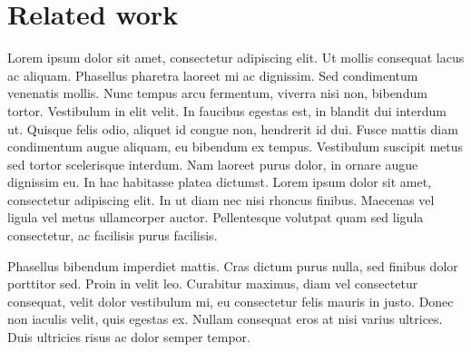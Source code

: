 \section{Related work}

Lorem ipsum dolor sit amet, consectetur adipiscing elit. Ut mollis consequat lacus ac aliquam. Phasellus pharetra laoreet mi ac dignissim. Sed condimentum venenatis mollis. Nunc tempus arcu fermentum, viverra nisi non, bibendum tortor. Vestibulum in elit velit. In faucibus egestas est, in blandit dui interdum ut. Quisque felis odio, aliquet id congue non, hendrerit id dui. Fusce mattis diam condimentum augue aliquam, eu bibendum ex tempus. Vestibulum suscipit metus sed tortor scelerisque interdum. Nam laoreet purus dolor, in ornare augue dignissim eu. In hac habitasse platea dictumst. Lorem ipsum dolor sit amet, consectetur adipiscing elit. In ut diam nec nisi rhoncus finibus. Maecenas vel ligula vel metus ullamcorper auctor. Pellentesque volutpat quam sed ligula consectetur, ac facilisis purus facilisis.

Phasellus bibendum imperdiet mattis. Cras dictum purus nulla, sed finibus dolor porttitor sed. Proin in velit leo. Curabitur maximus, diam vel consectetur consequat, velit dolor vestibulum mi, eu consectetur felis mauris in justo. Donec non iaculis velit, quis egestas ex. Nullam consequat eros at nisi varius ultrices. Duis ultricies risus ac dolor semper tempor.




% 
